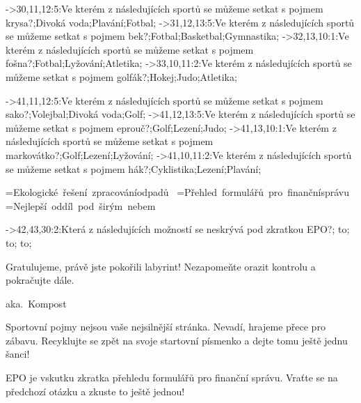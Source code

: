 ->30,11,12:5:Ve kterém z následujících sportů se může\-me setkat s pojmem {\questionfontit krysa}?;Divoká voda;Plavání;Fotbal;%
->31,12,13:5:Ve kterém z následujících sportů se může\-me setkat s pojmem {\questionfontit bek}?;Fotbal;Basketbal;Gymnastika;%
->32,13,10:1:Ve kterém z následujících sportů se může\-me setkat s pojmem {\questionfontit fošna}?;Fotbal;Lyžování;Atletika;%
->33,10,11:2:Ve kterém z následujících sportů se může\-me setkat s pojmem {\questionfontit golfák}?;Hokej;Judo;Atletika;%

->41,11,12:5:Ve kterém z následujících sportů se může\-me setkat s pojmem {\questionfontit sako}?;Volejbal;Divoká voda;Golf;%
->41,12,13:5:Ve kterém z následujících sportů se může\-me setkat s pojmem {\questionfontit eprouč}?;Golf;Lezení;Judo;%
->41,13,10:1:Ve kterém z následujících sportů se může\-me setkat s pojmem {\questionfontit markovátko}?;Golf;Lezení;Lyžování;%
->41,10,11:2:Ve kterém z následujících sportů se může\-me setkat s pojmem {\questionfontit hák}?;Cyklistika;Lezení;Plavání;%

=\vbox{\questionfont\baselineskip=40pt\hbox{Ekologické řešení zpracování}\hbox{odpadů}\hbox{~}}
=\vbox{\questionfont\baselineskip=40pt\hbox{Přehled formulářů pro finanční}\hbox{správu}\hbox{~}}
=\vbox{\questionfont\baselineskip=40pt\hbox{Nejlepší oddíl pod širým nebem}\hbox{~}}

->42,43,30:2:Která z následujících možností se {\questionfontit neskrý\-vá} pod zkratkou {\questionfontit EPO}?;{ \vbox to};{ \vbox to};{ \vbox to};%


%


%
%
\centerline{\topletterfont{}}
\vskip2cm
\baselineskip=50pt
{\finishfont Gratulujeme, právě jste po\-ko\-ři\-li labyrint! Nezapomeňte o\-ra\-zit kontrolu a pokračujte dále.}
\footing


%
%
\centerline{\topletterfont{}}
\vskip2cm
\centerline{\kompostfont aka.\ Kompost}
\vskip2cm
\baselineskip=40pt
{\questionfont Sportovní pojmy nejsou vaše nej\-sil\-nější stránka. Nevadí, hra\-je\-me přece pro zá\-ba\-vu. Re\-cyk\-luj\-te se zpět na svoje startovní písmenko a dejte tomu ještě jed\-nu šanci!}
\footing


%
%
\centerline{\topletterfont{}}
\vskip2cm
\baselineskip=40pt
{\questionfont EPO je vskutku zkratka přehledu for\-mu\-lá\-řů pro finanční správu. Vraťte se na předchozí otázku a zkuste to ještě jed\-nou!}
\footing


%
%
\bye
